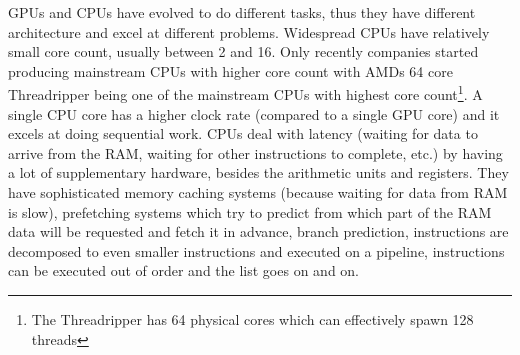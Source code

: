 GPUs and CPUs have evolved to do different tasks, thus they have different architecture and excel at different problems. Widespread CPUs have relatively small core count, usually between 2 and 16. Only recently companies started producing mainstream CPUs with higher core count with AMDs 64 core Threadripper being one of the mainstream CPUs with highest core count\footnote{The Threadripper has 64 physical cores which can effectively spawn 128 threads}. A single CPU core has a higher clock rate (compared to a single GPU core) and it excels at doing sequential work. CPUs deal with latency (waiting for data to arrive from the RAM, waiting for other instructions to complete, etc.) by having a lot of supplementary hardware, besides the arithmetic units and registers. They have sophisticated memory caching systems (because waiting for data from RAM is slow), prefetching systems which try to predict from which part of the RAM data will be requested and fetch it in advance, branch prediction, instructions are decomposed to even smaller instructions and executed on a pipeline, instructions can be executed out of order and the list goes on and on.

